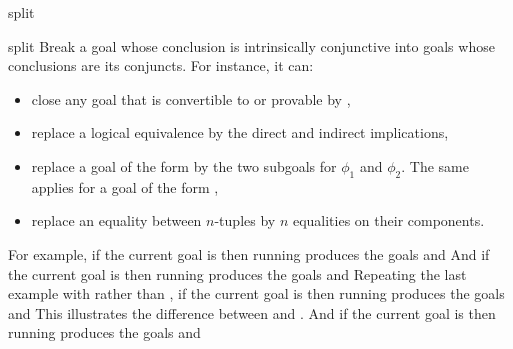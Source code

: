 \begin{tactic}{split}
  \begin{tsyntax}[empty]{split}
    Break a goal whose conclusion is intrinsically conjunctive into
    goals whose conclusions are its conjuncts.  For instance, it can:
    \begin{itemize}
    \item close any goal that is convertible to  or provable
      by ,
    \item replace a logical equivalence by the direct and indirect implications,
    \item replace a goal of the form  by the two
      subgoals for $\phi_1$ and $\phi_2$. The same applies for a goal of
      the form ,
    \item replace an equality between $n$-tuples by $n$ equalities
      on their components.
    \end{itemize}

  For example, if the current goal is
   then
  running 
  produces the goals
  and
  And if the current goal is
   then
  running 
  produces the goals
  and
  Repeating the last example with \ec{&&} rather than \ec{/\\},
  if the current goal is
   then
  running 
  produces the goals
  and
  This illustrates the difference between \ec{/\\} and \ec{&&}.
  And if the current goal is
   then
  running 
  produces the goals
  and
  \end{tsyntax}
\end{tactic}
